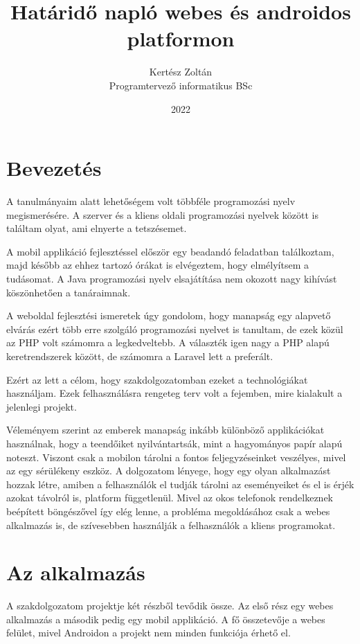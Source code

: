 \documentclass[
]{thesis-ekf}
\theoremstyle{definition}
\theoremstyle{remark}
\begin{document}
\title{Határidő napló webes és androidos platformon}
\author{Kertész Zoltán\\Programtervező informatikus BSc}
\date{2022}
\maketitle
\tableofcontents

\chapter*{Bevezetés}
A tanulmányaim alatt lehetőségem volt többféle programozási nyelv megismerésére. A szerver és a kliens oldali programozási nyelvek között is találtam olyat, ami elnyerte a tetszésemet. 

A mobil applikáció fejlesztéssel először egy beadandó feladatban találkoztam, majd később az ehhez tartozó órákat is elvégeztem, hogy elmélyítsem a tudásomat. A Java programozási nyelv elsajátítása nem okozott nagy kihívást köszönhetően a tanáraimnak. 

A weboldal fejlesztési ismeretek úgy gondolom, hogy manapság egy alapvető elvárás ezért több erre szolgáló programozási nyelvet is tanultam, de ezek közül az PHP volt számomra a legkedveltebb. A választék igen nagy a PHP alapú keretrendszerek között, de számomra a Laravel lett a preferált.

Ezért az lett a célom, hogy szakdolgozatomban ezeket a technológiákat használjam. Ezek felhasználásra rengeteg terv volt a fejemben, mire kialakult a jelenlegi projekt.

Véleményem szerint az emberek manapság inkább különböző applikációkat használnak, hogy a teendőiket nyilvántartsák, mint a hagyományos papír alapú noteszt. Viszont csak a mobilon tárolni a fontos feljegyzéseinket veszélyes, mivel az egy sérülékeny eszköz. A dolgozatom lényege, hogy egy olyan alkalmazást hozzak létre, amiben a felhasználók el tudják tárolni az eseményeiket és el is érjék azokat távolról is, platform függetlenül. Mivel az okos telefonok rendelkeznek beépített böngészővel így elég lenne, a probléma megoldásához csak a webes alkalmazás is, de szívesebben használják a felhasználók a kliens programokat. 

\chapter{Az alkalmazás}
A szakdolgozatom projektje két részből tevődik össze. Az első rész egy webes alkalmazás a második pedig egy mobil applikáció. A fő összetevője a webes felület, mivel Androidon a projekt nem minden funkciója érhető el. 
\end{document}
